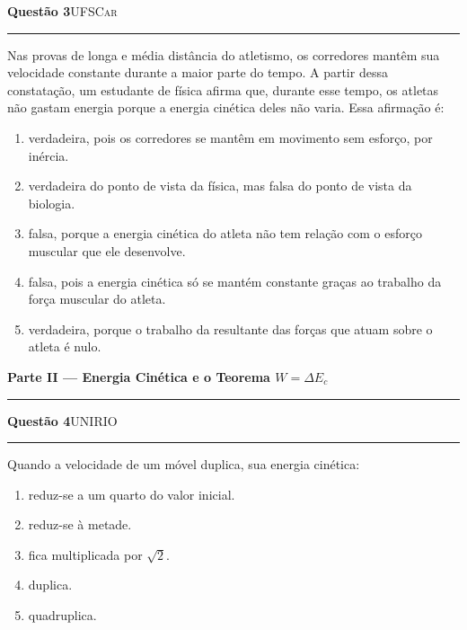 \documentclass[11pt,a4paper]{article}
\newcommand{\fonte}[1]{{\small\scshape\color{grafite}#1}}
\newenvironment{questao}[2]{%
  \needspace{6\baselineskip}
  \par\addvspace{1.6em}
  {\large\bfseries\color{vinho}Quest\~ao #1}\hfill #2\\[-0.55em]
  {\color{black!25}\rule{\linewidth}{0.4pt}}
  \par\nobreak\smallskip
}{\par\addvspace{0.4em}}
\newcommand{\parte}[1]{%
  \needspace{7\baselineskip}
  \vspace{1.8em}
  {\Large\bfseries #1}\\[-0.55em]
  {\color{black!30}\rule{\linewidth}{0.5pt}}
  \par\nobreak\smallskip
}
\begin{document}
\begin{questao}{3}{\fonte{UFSCar}}
Nas provas de longa e m\'edia dist\^ancia do atletismo, os corredores
mant\^em sua velocidade constante durante a maior parte do tempo. A
partir dessa constata\c{c}\~ao, um estudante de f\'isica afirma que,
durante esse tempo, os atletas n\~ao gastam energia porque a energia
cin\'etica deles n\~ao varia. Essa afirma\c{c}\~ao \'e:
\begin{enumerate}
  \item verdadeira, pois os corredores se mant\^em em movimento sem
        esfor\c{c}o, por in\'ercia.
  \item verdadeira do ponto de vista da f\'isica, mas falsa do ponto
        de vista da biologia.
  \item falsa, porque a energia cin\'etica do atleta n\~ao tem
        rela\c{c}\~ao com o esfor\c{c}o muscular que ele desenvolve.
  \item falsa, pois a energia cin\'etica s\'o se mant\'em constante
        gra\c{c}as ao trabalho da for\c{c}a muscular do atleta.
  \item verdadeira, porque o trabalho da resultante das for\c{c}as que
        atuam sobre o atleta \'e nulo.
\end{enumerate}
\end{questao}

\parte{Parte II --- Energia Cin\'etica e o Teorema $W = \Delta E_c$}

\begin{questao}{4}{\fonte{UNIRIO}}
Quando a velocidade de um m\'ovel duplica, sua energia cin\'etica:
\begin{enumerate}
  \item reduz-se a um quarto do valor inicial.
  \item reduz-se \`a metade.
  \item fica multiplicada por $\sqrt{2}$.
  \item duplica.
  \item quadruplica.
\end{enumerate}
\end{questao}
\end{document}
